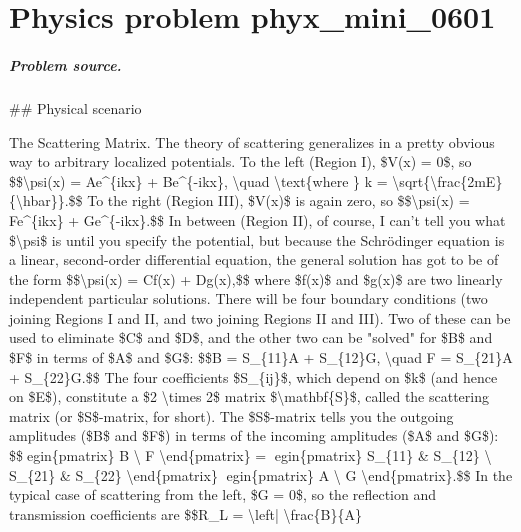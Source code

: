 
\chapter{Physics problem phyx\_mini\_0601}
\label{ch:PhyXMiniProblems_problem_phyx_mini_0601}

\paragraph{Problem source.}
\#\# Physical scenario

The Scattering Matrix. The theory of scattering generalizes in a pretty obvious way to arbitrary localized potentials. To the left (Region I), \$V(x) = 0\$, so \$\$\textbackslash{}psi(x) = Ae\textasciicircum{}\{ikx\} + Be\textasciicircum{}\{-ikx\}, \textbackslash{}quad \textbackslash{}text\{where \} k = \textbackslash{}sqrt\{\textbackslash{}frac\{2mE\}\{\textbackslash{}hbar\}\}.\$\$ To the right (Region III), \$V(x)\$ is again zero, so \$\$\textbackslash{}psi(x) = Fe\textasciicircum{}\{ikx\} + Ge\textasciicircum{}\{-ikx\}.\$\$ In between (Region II), of course, I can't tell you what \$\textbackslash{}psi\$ is until you specify the potential, but because the Schrödinger equation is a linear, second-order differential equation, the general solution has got to be of the form \$\$\textbackslash{}psi(x) = Cf(x) + Dg(x),\$\$ where \$f(x)\$ and \$g(x)\$ are two linearly independent particular solutions. There will be four boundary conditions (two joining Regions I and II, and two joining Regions II and III). Two of these can be used to eliminate \$C\$ and \$D\$, and the other two can be "solved" for \$B\$ and \$F\$ in terms of \$A\$ and \$G\$: \$\$B = S\_\{11\}A + S\_\{12\}G, \textbackslash{}quad F = S\_\{21\}A + S\_\{22\}G.\$\$ The four coefficients \$S\_\{ij\}\$, which depend on \$k\$ (and hence on \$E\$), constitute a \$2 \textbackslash{}times 2\$ matrix \$\textbackslash{}mathbf\{S\}\$, called the scattering matrix (or \$S\$-matrix, for short). The \$S\$-matrix tells you the outgoing amplitudes (\$B\$ and \$F\$) in terms of the incoming amplitudes (\$A\$ and \$G\$): \$\$egin\{pmatrix\} B \textbackslash{} F \textbackslash{}end\{pmatrix\} = egin\{pmatrix\} S\_\{11\} \& S\_\{12\} \textbackslash{} S\_\{21\} \& S\_\{22\} \textbackslash{}end\{pmatrix\} egin\{pmatrix\} A \textbackslash{} G \textbackslash{}end\{pmatrix\}.\$\$ In the typical case of scattering from the left, \$G = 0\$, so the reflection and transmission coefficients are \$\$R\_L = \textbackslash{}left| \textbackslash{}frac\{B\}\{A\} 
